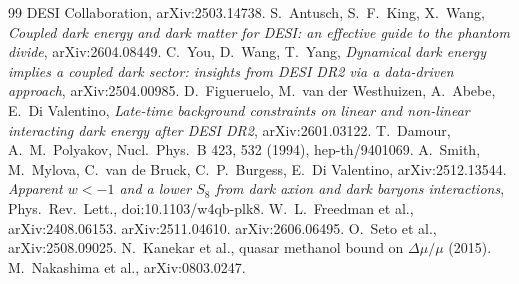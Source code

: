 \documentclass[11pt]{article}
\begin{document}
\begin{thebibliography}{99}
 DESI Collaboration, arXiv:2503.14738.
 S.~Antusch, S.~F.~King, X.~Wang, \emph{Coupled dark energy and dark matter for DESI: an effective
guide to the phantom divide}, arXiv:2604.08449.
 C.~You, D.~Wang, T.~Yang, \emph{Dynamical dark energy implies a coupled dark sector: insights from DESI
DR2 via a data-driven approach}, arXiv:2504.00985.
 D.~Figueruelo, M.~van der Westhuizen, A.~Abebe, E.~Di Valentino, \emph{Late-time background
constraints on linear and non-linear interacting dark energy after DESI DR2}, arXiv:2601.03122.
 T.~Damour, A.~M.~Polyakov, Nucl.\ Phys.\ B 423, 532 (1994), hep-th/9401069.
 A.~Smith, M.~Mylova, C.~van de Bruck, C.~P.~Burgess, E.~Di Valentino, arXiv:2512.13544.
 \emph{Apparent $w<-1$ and a lower $S_8$ from dark axion and dark baryons interactions}, Phys.\ Rev.\ Lett., doi:10.1103/w4qb-plk8.
 W.~L.~Freedman et al., arXiv:2408.06153.
 arXiv:2511.04610.
 arXiv:2606.06495.
 O.~Seto et al., arXiv:2508.09025.
 N.~Kanekar et al., quasar methanol bound on $\Delta\mu/\mu$ (2015).
 M.~Nakashima et al., arXiv:0803.0247.
\end{thebibliography}
\end{document}
